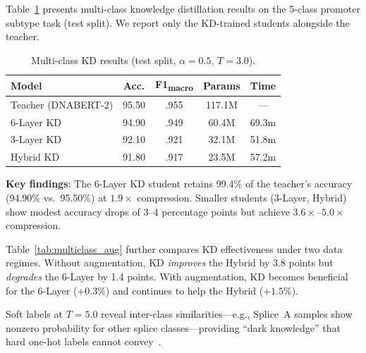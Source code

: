 \documentclass{article}
\begin{document}
Table~\ref{tab:multiclass} presents multi-class knowledge distillation results on the 5-class promoter subtype task (test split). We report only the KD-trained students alongside the teacher.

\begin{table}[t]
\centering
\caption{Multi-class KD results (test split, $\alpha\!=\!0.5$, $T\!=\!3.0$).}
\label{tab:multiclass}
\setlength{\tabcolsep}{5pt}
\begin{tabular}{lcccc}
\toprule
\textbf{Model} & \textbf{Acc.} & \textbf{F1\textsubscript{macro}} & \textbf{Params} & \textbf{Time} \\
\midrule
Teacher (DNABERT-2) & 95.50 & .955 & 117.1M & --- \\
\midrule
6-Layer KD          & 94.90 & .949 & 60.4M  & 69.3m \\
3-Layer KD          & 92.10 & .921 & 32.1M  & 51.8m \\
Hybrid KD           & 91.80 & .917 & 23.5M  & 57.2m \\
\bottomrule
\end{tabular}
\end{table}

\textbf{Key findings}: The 6-Layer KD student retains 99.4\% of the teacher's accuracy (94.90\% vs.\ 95.50\%) at $1.9\times$ compression. Smaller students (3-Layer, Hybrid) show modest accuracy drops of 3--4 percentage points but achieve $3.6\times$--$5.0\times$ compression.

Table~\ref{tab:multiclass_aug} further compares KD effectiveness under two data regimes.
Without augmentation, KD \emph{improves} the Hybrid by 3.8 points but \emph{degrades} the 6-Layer by 1.4 points.
With augmentation, KD becomes beneficial for the 6-Layer ($+0.3\%$) and continues to help the Hybrid ($+1.5\%$).

Soft labels at $T\!=\!5.0$ reveal inter-class similarities---e.g., Splice~A samples show nonzero probability for other splice classes---providing ``dark knowledge'' that hard one-hot labels cannot convey~\cite{hinton2015distilling}.
\end{document}
